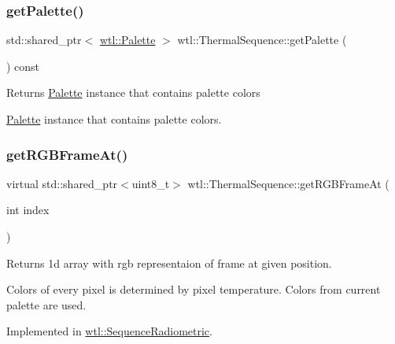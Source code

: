 \subsubsection{\texorpdfstring{get\+Palette()}{getPalette()}}
{\footnotesize\ttfamily std\+::shared\+\_\+ptr$<$ \hyperlink{classwtl_1_1_palette}{wtl\+::\+Palette} $>$ wtl\+::\+Thermal\+Sequence\+::get\+Palette (\begin{DoxyParamCaption}{ }\end{DoxyParamCaption}) const}

\begin{DoxyReturn}{Returns}
\hyperlink{classwtl_1_1_palette}{Palette} instance that contains palette colors 

\hyperlink{classwtl_1_1_palette}{Palette} instance that contains palette colors. 
\end{DoxyReturn}
\mbox{\label{classwtl_1_1_thermal_sequence_a0d13f29f0f89343516031c5146b62792}} 
\subsubsection{\texorpdfstring{get\+R\+G\+B\+Frame\+At()}{getRGBFrameAt()}}
{\footnotesize\ttfamily virtual std\+::shared\+\_\+ptr$<$uint8\+\_\+t$>$ wtl\+::\+Thermal\+Sequence\+::get\+R\+G\+B\+Frame\+At (\begin{DoxyParamCaption}\item[{int}]{index }\end{DoxyParamCaption})\hspace{0.3cm}{\ttfamily [pure virtual]}}



Returns 1d array with rgb representaion of frame at given position. 

Colors of every pixel is determined by pixel temperature. Colors from current palette are used. 

Implemented in \hyperlink{classwtl_1_1_sequence_radiometric_af0503fb4a89d9a356a4a68bad6da976d}{wtl\+::\+Sequence\+Radiometric}.

\mbox{\label{classwtl_1_1_thermal_sequence_a5bbbad98670f6179ce3c349fbe8e3086}} 
